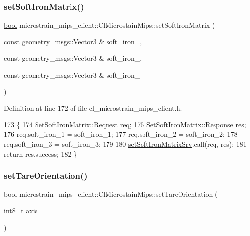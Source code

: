 \subsubsection{\texorpdfstring{set\+Soft\+Iron\+Matrix()}{setSoftIronMatrix()}}
{\footnotesize\ttfamily \hyperlink{classbool}{bool} microstrain\+\_\+mips\+\_\+client\+::\+Cl\+Microstain\+Mips\+::set\+Soft\+Iron\+Matrix (\begin{DoxyParamCaption}\item[{const geometry\+\_\+msgs\+::\+Vector3 \&}]{soft\+\_\+iron\+\_,  }\item[{const geometry\+\_\+msgs\+::\+Vector3 \&}]{soft\+\_\+iron\+\_,  }\item[{const geometry\+\_\+msgs\+::\+Vector3 \&}]{soft\+\_\+iron\+\_ }\end{DoxyParamCaption})\hspace{0.3cm}{\ttfamily [inline]}}



Definition at line 172 of file cl\+\_\+microstrain\+\_\+mips\+\_\+client.\+h.


\begin{DoxyCode}
173     \{
174         SetSoftIronMatrix::Request req;
175         SetSoftIronMatrix::Response res;
176         req.soft\_iron\_1 = soft\_iron\_1;
177         req.soft\_iron\_2 = soft\_iron\_2;
178         req.soft\_iron\_3 = soft\_iron\_3;
179 
180         \hyperlink{classmicrostrain__mips__client_1_1ClMicrostainMips_a17894e545ca0723840d7c00825b8741f}{setSoftIronMatrixSrv}.call(req, res);
181         \textcolor{keywordflow}{return} res.success;
182     \}
\end{DoxyCode}
\mbox{\label{classmicrostrain__mips__client_1_1ClMicrostainMips_adb9790b8ff91d8df9650ba7ac31f4bc5}} 
\subsubsection{\texorpdfstring{set\+Tare\+Orientation()}{setTareOrientation()}}
{\footnotesize\ttfamily \hyperlink{classbool}{bool} microstrain\+\_\+mips\+\_\+client\+::\+Cl\+Microstain\+Mips\+::set\+Tare\+Orientation (\begin{DoxyParamCaption}\item[{int8\+\_\+t}]{axis }\end{DoxyParamCaption})\hspace{0.3cm}{\ttfamily [inline]}}



